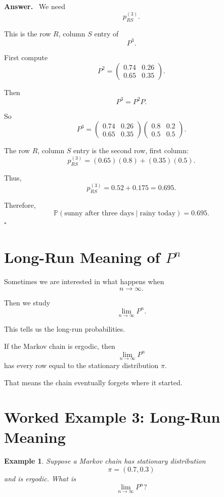 \documentclass[12pt,a4paper]{article}
\theoremstyle{notestyle}
\newtheorem{example}{Example}
\newenvironment{answer}
{\par\textbf{Answer.}\ }
{\hfill$\square$\par}
\newcommand{\Prob}{\mathbb{P}}
\begin{document}
\begin{answer}
We need
\[
p_{RS}^{(3)}.
\]

This is the row $R$, column $S$ entry of
\[
P^3.
\]

First compute
\[
P^2=
\begin{pmatrix}
0.74 & 0.26\\
0.65 & 0.35
\end{pmatrix}.
\]

Then
\[
P^3=P^2P.
\]

So
\[
P^3=
\begin{pmatrix}
0.74 & 0.26\\
0.65 & 0.35
\end{pmatrix}
\begin{pmatrix}
0.8 & 0.2\\
0.5 & 0.5
\end{pmatrix}.
\]

The row $R$, column $S$ entry is the second row, first column:
\[
p_{RS}^{(3)}
=
(0.65)(0.8)+(0.35)(0.5).
\]

Thus,
\[
p_{RS}^{(3)}
=
0.52+0.175
=
0.695.
\]

Therefore,
\[
\boxed{\Prob(\text{sunny after three days}\mid \text{rainy today})=0.695.}
\]
\end{answer}

\section{Long-Run Meaning of $P^n$}

Sometimes we are interested in what happens when
\[
n\to\infty.
\]

Then we study
\[
\lim_{n\to\infty}P^n.
\]

This tells us the long-run probabilities.

If the Markov chain is ergodic, then
\[
\lim_{n\to\infty}P^n
\]
has every row equal to the stationary distribution $\pi$.

That means the chain eventually forgets where it started.

\section{Worked Example 3: Long-Run Meaning}

\begin{example}
Suppose a Markov chain has stationary distribution
\[
\pi=(0.7,0.3)
\]
and is ergodic. What is
\[
\lim_{n\to\infty}P^n?
\]
\end{example}
\end{document}
